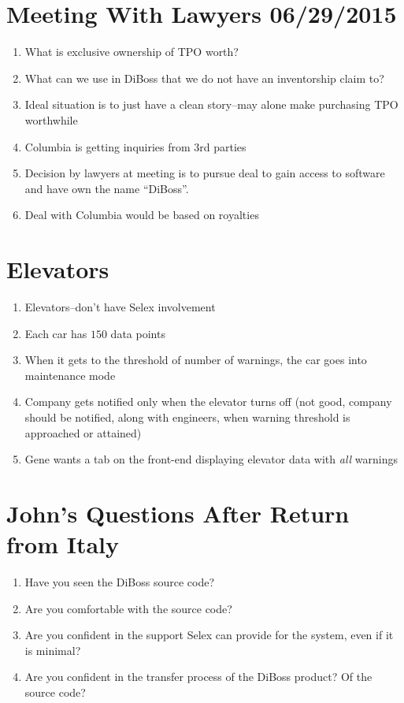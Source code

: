 \documentclass[12pt,a4paper]{article}
\begin{document}
\section{Meeting With Lawyers 06/29/2015}
\begin{enumerate}
	\item What is exclusive ownership of TPO worth?
	\item What can we use in DiBoss that we do not have an inventorship claim 
	to?
	\item Ideal situation is to just have a clean story--may alone make 
	purchasing TPO worthwhile
	\item Columbia is getting inquiries from $3$rd parties
	\item Decision by lawyers at meeting is to pursue deal to gain access to 
	software and have own the name ``DiBoss''.
	\item Deal with Columbia would be based on royalties 
\end{enumerate}
\section{Elevators}
\begin{enumerate}
	\item Elevators--don't have Selex involvement
	\item Each car has $150$ data points
	\item When it gets to the threshold of number of warnings, the car goes 
	into maintenance mode
	\item Company gets notified only when the elevator turns off (not good, 
	company should be notified, along with engineers, when warning threshold is 
	approached or attained)
	\item Gene wants a tab on the front-end displaying elevator data with 
	\emph{all} warnings
\end{enumerate}
\section{John's Questions After Return from Italy}
\begin{enumerate}
	\item Have you seen the DiBoss source code?
	\item Are you comfortable with the source code?
	\item Are you confident in the support Selex can provide
	for the system, even if it is minimal?
	\item Are you confident in the transfer process of the DiBoss product?
	Of the source code?
\end{enumerate}
\end{document}
